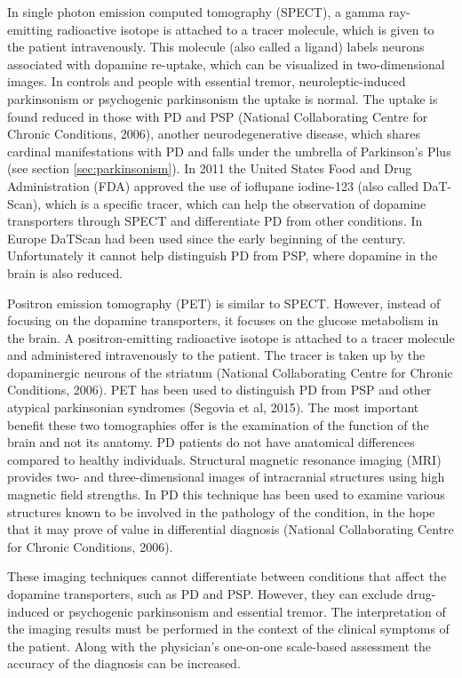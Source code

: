 In single photon emission computed tomography (\gls{SPECT}), a gamma ray-emitting radioactive isotope is attached to a tracer molecule, which is given to the patient intravenously. This molecule (also called a ligand) labels neurons associated with dopamine re-uptake, which can be visualized in two-dimensional images. In controls and people with essential tremor, neuroleptic-induced parkinsonism or psychogenic parkinsonism the uptake is normal. The uptake is found reduced in those with \gls{PD} and \gls{PSP} (National Collaborating Centre for Chronic Conditions, 2006), another neurodegenerative disease, which shares cardinal manifestations with \gls{PD} and falls under the umbrella of Parkinson's Plus (see section \ref{sec:parkinsonism}). In 2011 the United States Food and Drug Administration (\gls{FDA}) approved the use of ioflupane iodine-123 (also called DaT-Scan), which is a specific tracer, which can help the observation of dopamine transporters through \gls{SPECT} and differentiate \gls{PD} from other conditions. In Europe DaTScan had been used since the early beginning of the century. Unfortunately it cannot help distinguish \gls{PD} from \gls{PSP}, where dopamine in the brain is also reduced.

Positron emission tomography (\gls{PET}) is similar to \gls{SPECT}. However, instead of focusing on the dopamine transporters, it focuses on the glucose metabolism in the brain. A positron-emitting radioactive isotope is attached to a tracer molecule and administered intravenously to the patient. The tracer is taken up by the dopaminergic neurons of the striatum (National Collaborating Centre for Chronic Conditions, 2006). \gls{PET} has been used to distinguish \gls{PD} from \gls{PSP} and other atypical parkinsonian syndromes (Segovia et al, 2015). The most important benefit these two tomographies offer is the examination of the function of the brain and not its anatomy. \gls{PD} patients do not have anatomical differences compared to healthy individuals. Structural magnetic resonance imaging (\gls{MRI}) provides two- and three-dimensional images of intracranial structures using high magnetic field strengths. In \gls{PD} this technique has been used to examine various structures known to be involved in the pathology of the condition, in the hope that it may prove of value in differential diagnosis (National Collaborating Centre for Chronic Conditions, 2006).

These imaging techniques cannot differentiate between conditions that affect the dopamine transporters, such as \gls{PD} and \gls{PSP}. However, they can exclude drug-induced or psychogenic parkinsonism and essential tremor. The interpretation of the imaging results must be performed in the context of the clinical symptoms of the patient. Along with the physician's one-on-one scale-based assessment the accuracy of the diagnosis can be increased. 

